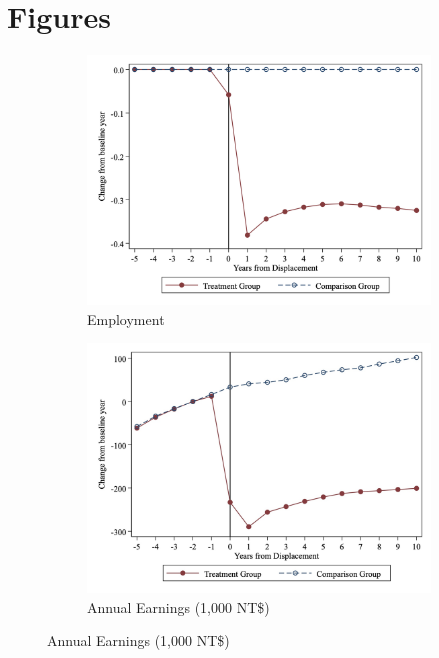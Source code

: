 

\section*{Figures}

\begin{figure}[H]  %
\begin{center}
\caption{Trend in Employment and Annual Earnings}\label{emp}
	\begin{subfigure}[b]{0.65\textwidth}
	 	\caption{Employment}\label{emp_e}
		\vspace{-0.85em}
	 	\includegraphics[width=\textwidth]{figures/Figure1_d_employed.png}  %
	 \end{subfigure}
	 \begin{subfigure}[b]{0.65\textwidth}
		\caption{Annual Earnings (1,000 NT\$)}\label{earnings}
		\vspace{-0.85em}
		\includegraphics[width=\textwidth]{figures/Figure1_real_wage.jpg}
        \end{subfigure}
\end{center}
\end{figure}
\vspace{-3em}

